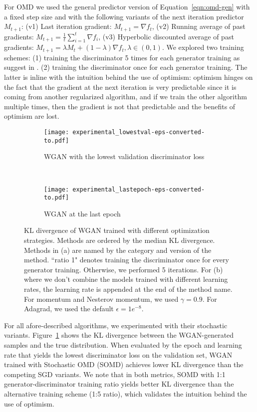 For OMD we used the general predictor version of Equation~\eqref{eqn:omd-gen} with a fixed step size and with the following variants of the next iteration predictor $M_{t+1}$:
(v1)  Last iteration gradient: $M_{t+1} = \nabla f_t$, (v2)  Running average of past gradients: $M_{t+1} = \frac{1}{t} \sum_{i=1}^t \nabla f_i$, (v3) Hyperbolic discounted average of past gradients: $M_{t+1} = \lambda M_{t} + (1-\lambda)\nabla f_t, \lambda \in (0,1)$. We explored two training schemes: (1) training the discriminator 5 times for each generator training as suggest in \cite{arjovsky2017wasserstein}. (2) training the discriminator once for each generator training. The latter is inline with the intuition behind the use of optimism: optimism hinges on the fact that the gradient at the next iteration is very predictable since it is coming from another regularized algorithm, and if we train the other algorithm multiple times, then the gradient is not that predictable and the benefits of optimism are lost.

\begin{figure}[htbp!]
    \centering
    \begin{subfigure}[t]{0.5\textwidth}
        \centering
        \texttt{[image: experimental\_lowestval-eps-converted-to.pdf]}
        \caption{WGAN with the lowest validation discriminator loss}
    \end{subfigure}%
    ~ 
    \begin{subfigure}[t]{0.5\textwidth}
        \centering
        \texttt{[image: experimental\_lastepoch-eps-converted-to.pdf]}
        \caption{WGAN at the last epoch}
    \end{subfigure}
    \caption{KL divergence of WGAN trained with different optimization strategies. Methods are ordered by the median KL divergence. Methods in (a) are named by the category and version of the method. ``ratio 1" denotes training the discriminator once for every generator training. Otherwise, we performed 5 iterations. For (b) where we don't combine the models trained with different learning rates, the learning rate is appended at the end of the method name. For momentum and Nesterov momentum, we used $\gamma=0.9$. For Adagrad, we used the default $\epsilon=1e^{-8}$.}
    \label{fig:expt}
\end{figure}

For all afore-described algorithms, we experimented with their stochastic variants. Figure~\ref{fig:expt} shows the KL divergence between the WGAN-generated samples and the true distribution. When evaluated by the epoch and learning rate that yields the lowest discriminator loss on the validation set,  WGAN trained with Stochastic OMD (SOMD) achieves lower KL divergence than the competing SGD variants.  We note that in both metrics, SOMD with 1:1 generator-discriminator training ratio yields better KL divergence than the alternative training scheme (1:5 ratio), which validates the intuition behind the use of optimism.